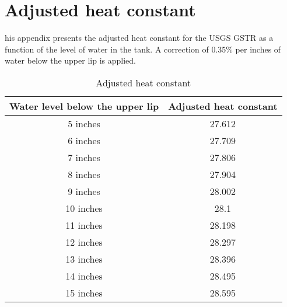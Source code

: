 %
%

\chapter{Adjusted heat constant}
\label{app:app01}

his appendix presents the adjusted heat constant for the USGS GSTR as a function of the level of water in the tank. A correction of 0.35\% per inches of water below the upper lip is applied.

\begin{table}[!htb]
    \centering
        \begin{tabular}{ cc }
        \hline
        Water level below the upper lip & Adjusted heat constant \\ \hline\hline
        5 inches & 27.612 \\ 
        6 inches & 27.709 \\ 
        7 inches & 27.806 \\ 
        8 inches & 27.904 \\ 
        9 inches & 28.002 \\ 
        10 inches & 28.1 \\ 
        11 inches & 28.198 \\ 
        12 inches & 28.297 \\ 
        13 inches & 28.396 \\ 
        14 inches & 28.495 \\
        15 inches & 28.595 \\ 
        \end{tabular}
        \caption{Adjusted heat constant}\label{tab:corr}
\end{table}



\
